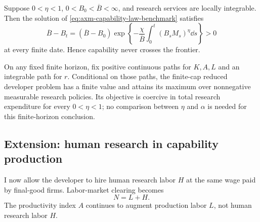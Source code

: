\begin{proposition}
\label{prop:axm-finite-cap-invariance}
Suppose \(0<\eta<1\), \(0<B_0<\overline B<\infty\), and research services are
locally integrable. Then the solution of
\eqref{eq:axm-capability-law-benchmark} satisfies
\begin{equation}
 \overline B-B_t=(\overline B-B_0)
 \exp\left\{-\frac{\chi}{\overline B}
 \int_0^t(B_sM_s)^\eta\dd s\right\}>0
 \label{eq:axm-cap-gap-solution}
\end{equation}
at every finite date. Hence capability never crosses the frontier.

On any fixed finite horizon, fix positive continuous paths for \(K,A,L\) and an
integrable path for \(r\). Conditional on those paths, the finite-cap reduced
developer problem has a finite value and attains its maximum over nonnegative
measurable research policies. Its objective is coercive in total research
expenditure for every \(0<\eta<1\); no comparison between \(\eta\) and
\(\alpha\) is needed for this finite-horizon conclusion.
\end{proposition}

\subsection{Extension: human research in capability production}
\label{sec:axm-human-research-extension}

I now allow the developer to hire human research labor \(H\) at the same wage
paid by final-good firms. Labor-market clearing becomes
\begin{equation}
 N=L+H.
 \label{eq:axm-labor-market}
\end{equation}
The productivity index \(A\) continues to augment production labor \(L\), not
human research labor \(H\).

